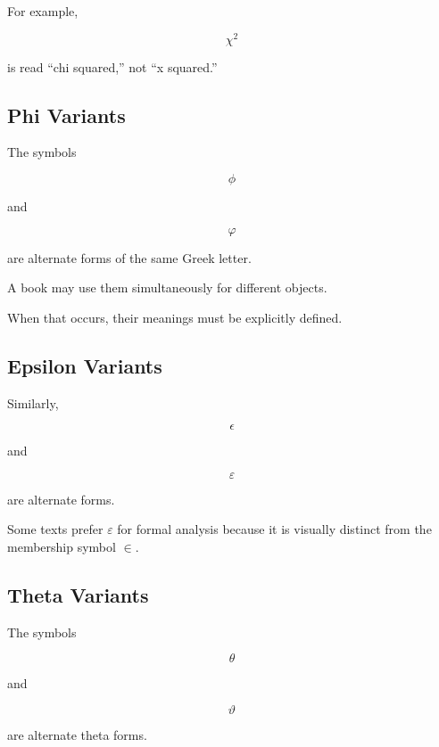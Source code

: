 For example,

\[
\boxed{
\chi^2
}
\]

is read ``chi squared,'' not ``x squared.''

\subsection{Phi Variants}
\label{subsec:phi-variants}

The symbols

\[
\boxed{
\phi
}
\]

and

\[
\boxed{
\varphi
}
\]

are alternate forms of the same Greek letter.

A book may use them simultaneously for different objects.

When that occurs, their meanings must be explicitly defined.

\subsection{Epsilon Variants}
\label{subsec:epsilon-variants}

Similarly,

\[
\boxed{
\epsilon
}
\]

and

\[
\boxed{
\varepsilon
}
\]

are alternate forms.

Some texts prefer \(\varepsilon\) for formal analysis because it is visually
distinct from the membership symbol \(\in\).

\subsection{Theta Variants}
\label{subsec:theta-variants}

The symbols

\[
\boxed{
\theta
}
\]

and

\[
\boxed{
\vartheta
}
\]

are alternate theta forms.

